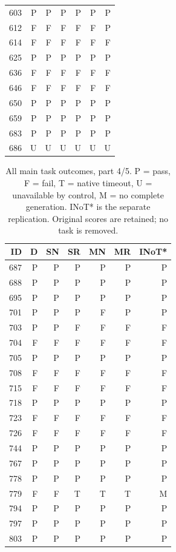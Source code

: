 \begin{table}[!htbp]
\begin{tabular*}{\textwidth}{@{\extracolsep{\fill}}rrrrrrr}
603 & P & P & P & P & P & P\\
612 & F & F & F & F & F & P\\
614 & F & F & F & F & F & F\\
625 & P & P & P & P & P & P\\
636 & F & F & F & F & F & F\\
646 & F & F & F & F & F & F\\
650 & P & P & P & P & P & P\\
659 & P & P & P & P & P & P\\
683 & P & P & P & P & P & P\\
686 & U & U & U & U & U & U\\
\bottomrule\end{tabular*}\end{table}
\clearpage
\begin{table}[!htbp]\centering\footnotesize
\caption{All main task outcomes, part 4/5. P = pass, F = fail, T = native timeout, U = unavailable by control, M = no complete generation. INoT* is the separate replication. Original scores are retained; no task is removed.}
\begin{tabular*}{\textwidth}{@{\extracolsep{\fill}}rrrrrrr}\toprule
ID & D & SN & SR & MN & MR & INoT*\\\midrule
687 & P & P & P & P & P & P\\
688 & P & P & P & P & P & P\\
695 & P & P & P & P & P & P\\
701 & P & P & P & F & P & P\\
703 & P & P & F & F & F & F\\
704 & F & F & F & F & F & F\\
705 & P & P & P & P & P & P\\
708 & F & F & F & F & F & F\\
715 & F & F & F & F & F & F\\
718 & P & P & P & P & P & P\\
723 & F & F & F & F & F & F\\
726 & F & F & F & F & F & F\\
744 & P & P & P & P & P & P\\
767 & P & P & P & P & P & P\\
778 & P & P & P & P & P & P\\
779 & F & F & T & T & T & M\\
794 & P & P & P & P & P & P\\
797 & P & P & P & P & P & P\\
803 & P & P & P & P & P & P\\

\end{tabular*}
\end{table}
